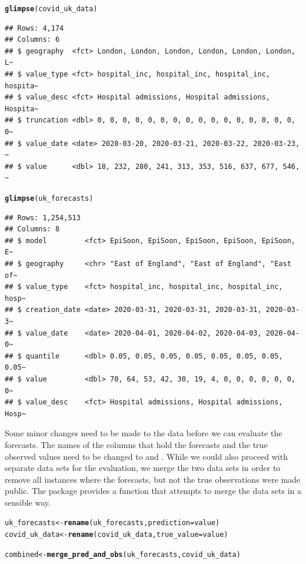 \documentclass[article,shortnames]{jss}\usepackage[]{graphicx}\usepackage[]{color}
\makeatletter
\newcommand{\hlstd}[1]{\textcolor[rgb]{0.345,0.345,0.345}{#1}}%
\newcommand{\hlkwb}[1]{\textcolor[rgb]{0.69,0.353,0.396}{#1}}%
\newcommand{\hlkwc}[1]{\textcolor[rgb]{0.333,0.667,0.333}{#1}}%
\newcommand{\hlkwd}[1]{\textcolor[rgb]{0.737,0.353,0.396}{\textbf{#1}}}%
\newenvironment{kframe}{%
 \def\at@end@of@kframe{}%
 \ifinner\ifhmode%
  \def\at@end@of@kframe{\end{minipage}}%
  \begin{minipage}{\columnwidth}%
 \fi\fi%
 \def\FrameCommand##1{\hskip\@totalleftmargin \hskip-\fboxsep
 \colorbox{shadecolor}{##1}\hskip-\fboxsep
     \hskip-\linewidth \hskip-\@totalleftmargin \hskip\columnwidth}%
 \MakeFramed {\advance\hsize-\width
   \@totalleftmargin\z@ \linewidth\hsize
   \@setminipage}}%
 {\par\unskip\endMakeFramed%
 \at@end@of@kframe}
\newenvironment{knitrout}{}{} %
\makeatother
\begin{document}
\begin{knitrout}
\color{fgcolor}\begin{kframe}
\begin{alltt}
\hlkwd{glimpse}\hlstd{(covid_uk_data)}
\end{alltt}
\begin{verbatim}
## Rows: 4,174
## Columns: 6
## $ geography  <fct> London, London, London, London, London, London, L~
## $ value_type <fct> hospital_inc, hospital_inc, hospital_inc, hospita~
## $ value_desc <fct> Hospital admissions, Hospital admissions, Hospita~
## $ truncation <dbl> 0, 0, 0, 0, 0, 0, 0, 0, 0, 0, 0, 0, 0, 0, 0, 0, 0~
## $ value_date <date> 2020-03-20, 2020-03-21, 2020-03-22, 2020-03-23, ~
## $ value      <dbl> 18, 232, 280, 241, 313, 353, 516, 637, 677, 546, ~
\end{verbatim}
\begin{alltt}
\hlkwd{glimpse}\hlstd{(uk_forecasts)}
\end{alltt}
\begin{verbatim}
## Rows: 1,254,513
## Columns: 8
## $ model         <fct> EpiSoon, EpiSoon, EpiSoon, EpiSoon, EpiSoon, E~
## $ geography     <chr> "East of England", "East of England", "East of~
## $ value_type    <fct> hospital_inc, hospital_inc, hospital_inc, hosp~
## $ creation_date <date> 2020-03-31, 2020-03-31, 2020-03-31, 2020-03-3~
## $ value_date    <date> 2020-04-01, 2020-04-02, 2020-04-03, 2020-04-0~
## $ quantile      <dbl> 0.05, 0.05, 0.05, 0.05, 0.05, 0.05, 0.05, 0.05~
## $ value         <dbl> 70, 64, 53, 42, 30, 19, 4, 0, 0, 0, 0, 0, 0, 0~
## $ value_desc    <fct> Hospital admissions, Hospital admissions, Hosp~
\end{verbatim}
\end{kframe}
\end{knitrout}
% 
Some minor changes need to be made to the data before we can evaluate the forecasts. The names of the columns that hold the forecasts and the true observed values need to be changed to  and . While we could also proceed with separate data sets for the evaluation, we merge the two data sets in order to remove all instances where the forecasts, but not the true observations were made public. The  package provides a function that attempts to merge the data sets in a sensible way. 
% 
\begin{knitrout}
\color{fgcolor}\begin{kframe}
\begin{alltt}
\hlstd{uk_forecasts} \hlkwb{<-} \hlkwd{rename}\hlstd{(uk_forecasts,} \hlkwc{prediction} \hlstd{= value)}
\hlstd{covid_uk_data} \hlkwb{<-} \hlkwd{rename}\hlstd{(covid_uk_data,} \hlkwc{true_value} \hlstd{= value)}

\hlstd{combined} \hlkwb{<-} \hlkwd{merge_pred_and_obs}\hlstd{(uk_forecasts, covid_uk_data)}
\end{alltt}
\end{kframe}
\end{knitrout}
\end{document}
